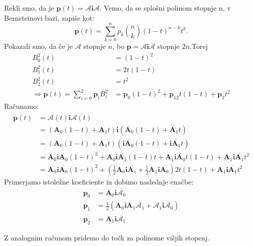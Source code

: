 \documentclass[mat1]{fmfdelo}
\newcommand{\ii}{\boldsymbol i}
\newcommand{\pp}{\boldsymbol p}
\newcommand{\ba}{\boldsymbol A}
\newcommand{\A}{\mathcal A}
\begin{document}
\begin{primer}
Rekli smo, da je $\pp(t) = \A \ii \overline{\A}$. Vemo, da se splošni polinom stopnje n, v Bernsteinovi bazi, zapiše kot:
\begin{equation*}
\pp(t) = \sum_{k=0}^n p_k \binom{n}{k}(1-t)^{n-k}t^k.
\end{equation*}
Pokazali smo, da če je $\A$ stopnje $n$, bo $\pp = \A\ii\overline{\A}$ stopnje $2n$.Torej
\begin{equation*}
\begin{split}
B_0^2(t)& = (1-t)^2\\
B_1^2(t) &= 2t(1-t)\\
B_2^2(t) &= t^2 \\
\Longrightarrow \pp(t) = \sum_{i=0}^2 \pp_i B_i^2 &= \pp_0 (1-t)^2 + \pp_12t(1-t) + \pp_2t^2
\end{split}
\end{equation*}
Računamo:
\begin{equation*}
\begin{split}
\pp(t) &= \A(t)\ii\overline{\A(t)} \\
&= (\boldsymbol{A}_0(1-t) + \boldsymbol{A}_1t) \ii ( \overline{\boldsymbol{A}_0}(1-t) + \overline{\boldsymbol{A}_1}t) \\
& = (\boldsymbol{A}_0(1-t) + \boldsymbol{A}_1t) (\ii\overline{\boldsymbol{A}_0}(1-t) + \ii\overline{\boldsymbol{A}_1}t) \\
&=\ba_0 \ii \overline{\ba_0} (1-t)^2 + \ba_0\ii\overline{\ba_1}(1-t)t + \ba_1\ii\overline{\ba_0}t(1-t) + \ba_1\ii\overline{\ba_1}t^2 \\
&= \ba_0 \ii \overline{\ba_0} (1-t)^2 + \left(\frac{1}{2}\ba_0\ii\overline{\ba_1} +\frac{1}{2} \ba_1\ii\overline{\ba_0}\right)2t(1-t) + \ba_1\ii\overline{\ba_1}t^2
\end{split}
\end{equation*}
Primerjamo istoležne koeficiente in dobimo naslednje enačbe:
\begin{equation*}
\begin{split}
\pp_0&= \ba_0\ii\overline{\A_0} \\
\pp_1&= \frac{1}{2}\left( \ba_0\ii\ba_1\overline{\A_1} + \A_1\ii\overline{\A_0}\right)\\
\pp_2&= \ba_1\ii\overline{\A_1}\end{split}
\end{equation*}
\end{primer}
Z analognim računom pridemo do točk za polinome višjih stopenj.
\end{document}
